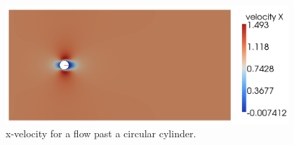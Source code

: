\begin{figure}[H]
 \begin{center}
  \includegraphics[width=0.95\textwidth]{pics/tut_fluid_xvel.png}   
  \caption{x-velocity for a flow past a circular cylinder.}
  \label{fig:FlowPastCylinder_x-velocity}
\end{center}
\end{figure}
